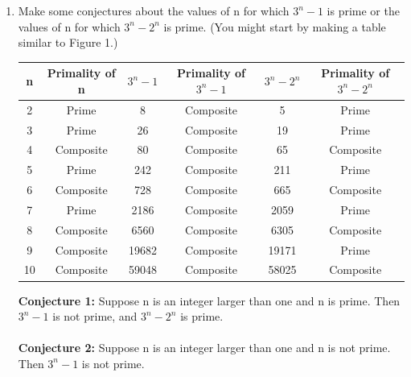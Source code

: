 \documentclass{article}
\begin{document}
\begin{enumerate}
    
    \item 
        Make some conjectures about the values of n for which $3^{n} - 1$ is prime or
        the values of n for which $3^{n}- 2^{n}$ is prime. (You might start by making a
        table similar to Figure 1.)
        \begin{center}
             \begin{tabular}{c | c | c | c | c | c} 
                 n & Primality of n & $3^{n} - 1$ & Primality of $3^{n} - 1$ & $3^{n}- 2^{n}$
                 & Primality of $3^{n} - 2^{n}$ \\ [1ex] 
                 \hline
                 2 & Prime & 8 & Composite & 5 & Prime\\ 
                 \hline
                 3 & Prime & 26 & Composite & 19 & Prime\\
                 \hline
                 4 & Composite & 80 & Composite & 65 & Composite\\
                 \hline
                 5 & Prime & 242 & Composite & 211 & Prime\\
                 \hline
                 6 & Composite & 728 & Composite & 665 & Composite\\
                 \hline
                 7 & Prime & 2186 & Composite & 2059 & Prime\\
                 \hline
                 8 & Composite & 6560 & Composite & 6305 & Composite\\
                 \hline
                 9 & Composite & 19682 & Composite & 19171 & Prime\\
                 \hline
                 10 & Composite & 59048 & Composite & 58025 & Composite\\
                 \hline
            \end{tabular}
        \end{center}
        \textbf{Conjecture 1:} Suppose n is an integer larger than one and n is prime. Then $3^{n}- 1$ is not prime, and $3^{n}- 2^{n}$ is prime. \\\\
        \textbf{Conjecture 2:} Suppose n is an integer larger than one and n is not prime. Then $3^{n}- 1$ is not prime.


\end{enumerate}
\end{document}
